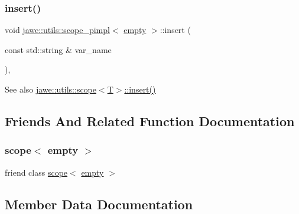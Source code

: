 \subsubsection{\texorpdfstring{insert()}{insert()}}
{\footnotesize\ttfamily void \hyperlink{classjawe_1_1utils_1_1scope__pimpl}{jawe\+::utils\+::scope\+\_\+pimpl}$<$ \hyperlink{classjawe_1_1utils_1_1empty}{empty} $>$\+::insert (\begin{DoxyParamCaption}\item[{const std\+::string \&}]{var\+\_\+name }\end{DoxyParamCaption})\hspace{0.3cm}{\ttfamily [inline]}, {\ttfamily [private]}}

\begin{DoxySeeAlso}{See also}
\hyperlink{classjawe_1_1utils_1_1scope_ab64ac5cc3bce5c9909aff566ac50fac0}{jawe\+::utils\+::scope$<$\+T$>$\+::insert()} 
\end{DoxySeeAlso}


\subsection{Friends And Related Function Documentation}
\mbox{\label{classjawe_1_1utils_1_1scope__pimpl_3_01empty_01_4_ad892ae47ebacee276bb9a4ac0aae408e}} 
\subsubsection{\texorpdfstring{scope$<$ empty $>$}{scope< empty >}}
{\footnotesize\ttfamily friend class \hyperlink{classjawe_1_1utils_1_1scope}{scope}$<$ \hyperlink{classjawe_1_1utils_1_1empty}{empty} $>$\hspace{0.3cm}{\ttfamily [friend]}}



\subsection{Member Data Documentation}
\mbox{\label{classjawe_1_1utils_1_1scope__pimpl_3_01empty_01_4_a54818451cbe56d4e17fa12c2a195c33a}} 
